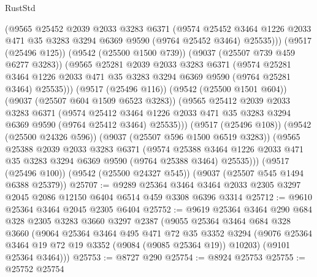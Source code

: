 \begin{lexlean}{RustStd}
\begin{coremodule}
            (@9565
              @25452
              @2039
              @2033
              @3283
              @6371
              (@9574
                @25452
                @3464
                @1226
                @2033
                @471
                @35
                @3283
                @3294
                @6369
                @9590
                (@9764 @25452 @3464)
                @25535)))
          (@9517 (@25496 @125))
          (@9542 (@25500 @1500 @739))
          (@9037 (@25507 @739 @459 @6277 @3283))
          (@9565
            @25281
            @2039
            @2033
            @3283
            @6371
            (@9574
              @25281
              @3464
              @1226
              @2033
              @471
              @35
              @3283
              @3294
              @6369
              @9590
              (@9764 @25281 @3464)
              @25535)))
        (@9517 (@25496 @116))
        (@9542 (@25500 @1501 @604))
        (@9037 (@25507 @604 @1509 @6523 @3283))
        (@9565
          @25412
          @2039
          @2033
          @3283
          @6371
          (@9574
            @25412
            @3464
            @1226
            @2033
            @471
            @35
            @3283
            @3294
            @6369
            @9590
            (@9764 @25412 @3464)
            @25535)))
      (@9517 (@25496 @108))
      (@9542 (@25500 @24326 @596))
      (@9037 (@25507 @596 @1500 @6519 @3283))
      (@9565
        @25388
        @2039
        @2033
        @3283
        @6371
        (@9574
          @25388
          @3464
          @1226
          @2033
          @471
          @35
          @3283
          @3294
          @6369
          @9590
          (@9764 @25388 @3464)
          @25535)))
    (@9517 (@25496 @100))
    (@9542 (@25500 @24327 @545))
    (@9037 (@25507 @545 @1494 @6388 @25379))
@25707 := @9289
    @25364
    @3464
    @3464
    @2033
    @2305
    @3297
    @2045
    @2086
    @12150
    @6404
    @6514
    @459
    @3308
    @6396
    @3314
@25712 := @9610 @25364 @3464 @2045 @2305 @6404
@25752 := @9619
    @25364
    @3464
    @290
    @684
    @328
    @2305
    @3283
    @3660
    @3297
    @2387
    (@9055
      @25364
      @3464
      @684
      @328
      @3660
      (@9064
        @25364
        @3464
        @495
        @471
        @72
        @35
        @3352
        @3294
        (@9076 @25364 @3464 @19 @72 @19 @3352 (@9084 (@9085 @25364 @19)) @10203)
        (@9101 @25364 @3464)))
@25753 := @8727 @290
@25754 := @8924 @25753
@25755 := @25752 @25754

\end{coremodule}
\end{lexlean}
